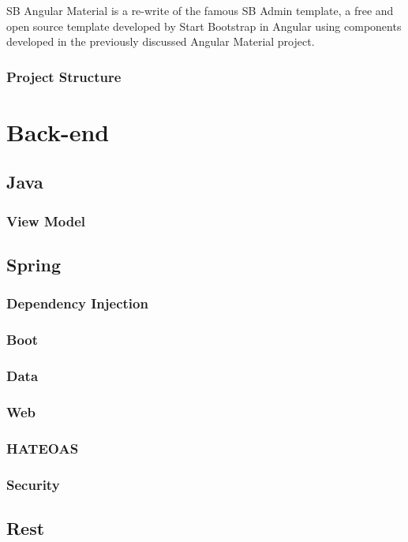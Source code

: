 SB Angular Material is a re-write of the famous SB Admin template\cite{angulartemplate}, a free and open source template developed by Start Bootstrap\cite{sbadmin} in Angular using components developed in the previously discussed Angular Material project.
\subsubsection{Project Structure}

\section{Back-end}
\label{cha:concepts:sec:backend}

\subsection{Java}
\subsubsection{View Model}
\subsection{Spring}
\subsubsection{Dependency Injection}
\subsubsection{Boot}
\subsubsection{Data}
\subsubsection{Web}
\subsubsection{HATEOAS}
\subsubsection{Security}

\subsection{Rest}
